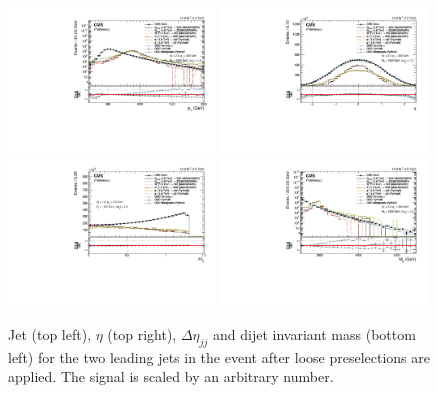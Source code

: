 \begin{figure}[h!]
\centering
\includegraphics[width=0.49\textwidth]{figures/analysis/search2/AN-16-235/plots/qcdcp_Pt.pdf}
\includegraphics[width=0.49\textwidth]{figures/analysis/search2/AN-16-235/plots/qcdcp_Eta.pdf}\\
\includegraphics[width=0.49\textwidth]{figures/analysis/search2/AN-16-235/plots/qcdcp_DeltaEta.pdf}
\includegraphics[width=0.49\textwidth]{figures/analysis/search2/AN-16-235/plots/qcdcp_Mjj.pdf}
\caption{Jet \PT{} (top left), $\eta$ (top right), $\Delta \eta_{jj}$ and dijet invariant mass (bottom left) for the two leading jets in the event after loose preselections are applied. The signal is scaled by an arbitrary number.}
\label{fig:searchII:kinematics-all}
\end{figure}


